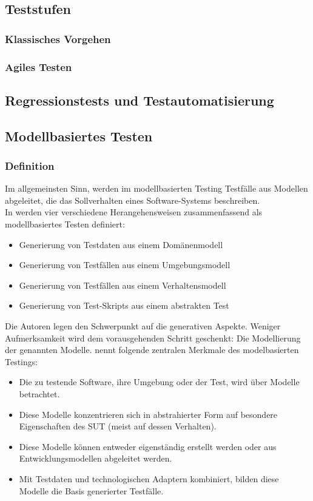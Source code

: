 \subsection{Teststufen}
\subsubsection{Klassisches Vorgehen}
\subsubsection{Agiles Testen}
\subsection{Regressionstests und Testautomatisierung}
\subsection{Modellbasiertes Testen}
\subsubsection{Definition}
Im allgemeinsten Sinn, werden im modellbasierten Testing Testfälle aus Modellen abgeleitet, die das Sollverhalten eines Software-Systems beschreiben. \cite{sensler_testautomatisierung_2011}\\

In \cite{utting_practical_2007} werden vier verschiedene Herangehensweisen zusammenfassend als modellbasiertes Testen definiert:

\begin{itemize}
\item Generierung von Testdaten aus einem Domänenmodell
\item Generierung von Testfällen aus einem Umgebungsmodell
\item Generierung von Testfällen aus einem Verhaltensmodell
\item Generierung von Test-Skripts aus einem abstrakten Test
\end{itemize}

Die Autoren legen den Schwerpunkt auf die generativen Aspekte. Weniger Aufmerksamkeit wird dem vorausgehenden Schritt geschenkt: Die Modellierung der genannten Modelle. \cite{rossner_basiswissen_2010} nennt folgende  zentralen Merkmale des modelbasierten Testings:

\begin{itemize}
\item Die zu testende Software, ihre Umgebung oder der Test, wird über Modelle betrachtet.
\item Diese Modelle konzentrieren sich in abstrahierter Form auf besondere Eigenschaften des SUT (meist auf dessen Verhalten).
\item Diese Modelle können entweder eigenständig erstellt werden oder aus Entwicklungsmodellen abgeleitet werden.
\item Mit Testdaten und technologischen Adaptern kombiniert, bilden diese Modelle die Basis generierter Testfälle.
\end{itemize}

